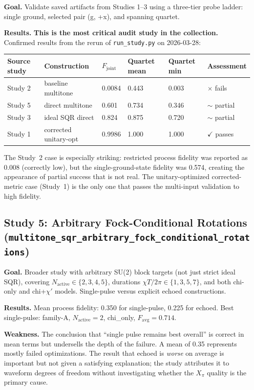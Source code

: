\documentclass[11pt,letterpaper]{article}
\newcommand{\chiT}{\chi T / 2\pi}
\newcommand{\nact}{N_{\text{active}}}
\newcommand{\passmark}{\textcolor{pass}{$\checkmark$}}
\newcommand{\failmark}{\textcolor{fail}{$\times$}}
\newcommand{\warnmark}{\textcolor{warn}{$\sim$}}
\begin{document}
\textbf{Goal.}  Validate saved artifacts from Studies 1--3 using a three-tier
probe ladder: single ground, selected pair (g, +x), and spanning quartet.

\textbf{Results.}  \textbf{This is the most critical audit study in the collection.}
Confirmed results from the rerun of \texttt{run\_study.py} on 2026-03-28:

\begin{center}
\begin{tabular}{llllll}
\toprule
Source study & Construction & $F_\text{joint}$ & Quartet mean & Quartet min & Assessment \\
\midrule
Study 2 & baseline multitone & 0.0084 & 0.443 & 0.003 & \failmark{} fails \\
Study 5 & direct multitone & 0.601 & 0.734 & 0.346 & \warnmark{} partial \\
Study 3 & ideal SQR direct & 0.824 & 0.875 & 0.720 & \warnmark{} partial \\
Study 1 & corrected unitary-opt & 0.9986 & 1.000 & 1.000 & \passmark{} passes \\
\bottomrule
\end{tabular}
\end{center}

The Study~2 case is especially striking: restricted process fidelity was reported
as 0.008 (correctly low), but the single-ground-state fidelity was 0.574,
creating the appearance of partial success that is not real.
The unitary-optimized corrected-metric case (Study~1) is the only one that
passes the multi-input validation to high fidelity.

\subsection{Study 5: Arbitrary Fock-Conditional Rotations (\texttt{multitone\_sqr\_arbitrary\_fock\_conditional\_rotations})}

\textbf{Goal.}  Broader study with arbitrary SU(2) block targets (not just
strict ideal SQR), covering $\nact \in \{2,3,4,5\}$, durations
$\chiT \in \{1,3,5,7\}$, and both chi-only and chi+$\chi'$ models.
Single-pulse versus explicit echoed constructions.

\textbf{Results.}  Mean process fidelity: 0.350 for single-pulse, 0.225 for echoed.
Best single-pulse: family-A, $\nact = 2$, chi\_only, $F_\text{avg} = 0.714$.

\textbf{Weakness.}  The conclusion that ``single pulse remains best overall''
is correct in mean terms but undersells the depth of the failure.
A mean of 0.35 represents mostly failed optimizations.
The result that echoed is \emph{worse} on average is important but not given
a satisfying explanation; the study attributes it to waveform degrees of freedom
without investigating whether the $X_\pi$ quality is the primary cause.
\end{document}
